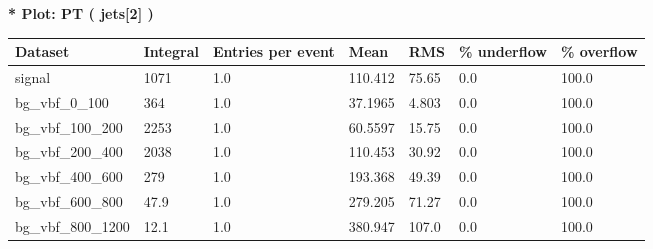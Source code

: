 \documentclass[a4paper, 10pt]{article}
\begin{document}
\textbf{* Plot: PT ( jets[2] ) }\\
   \begin{table}[H]
  \begin{center}
    \begin{tabular}{|m{23.0mm}|m{23.0mm}|m{18.0mm}|m{19.0mm}|m{19.0mm}|m{19.0mm}|m{19.0mm}|}
      \hline
      {\cellcolor{yellow}         Dataset}& {\cellcolor{yellow}         Integral}& {\cellcolor{yellow}         Entries per event}& {\cellcolor{yellow}         Mean}& {\cellcolor{yellow}         RMS}& {\cellcolor{yellow}         \% underflow}& {\cellcolor{yellow}         \% overflow}\\
      \hline
      {\cellcolor{white}         signal}& {\cellcolor{white}         1071}& {\cellcolor{white}         1.0}& {\cellcolor{white}         110.412}& {\cellcolor{white}         75.65}& {\cellcolor{red}         0.0}& {\cellcolor{red}         100.0}\\
      \hline
      {\cellcolor{white}         bg\_vbf\_0\_100}& {\cellcolor{white}         364}& {\cellcolor{white}         1.0}& {\cellcolor{white}         37.1965}& {\cellcolor{white}         4.803}& {\cellcolor{red}         0.0}& {\cellcolor{red}         100.0}\\
      \hline
      {\cellcolor{white}         bg\_vbf\_100\_200}& {\cellcolor{white}         2253}& {\cellcolor{white}         1.0}& {\cellcolor{white}         60.5597}& {\cellcolor{white}         15.75}& {\cellcolor{red}         0.0}& {\cellcolor{red}         100.0}\\
      \hline
      {\cellcolor{white}         bg\_vbf\_200\_400}& {\cellcolor{white}         2038}& {\cellcolor{white}         1.0}& {\cellcolor{white}         110.453}& {\cellcolor{white}         30.92}& {\cellcolor{red}         0.0}& {\cellcolor{red}         100.0}\\
      \hline
      {\cellcolor{white}         bg\_vbf\_400\_600}& {\cellcolor{white}         279}& {\cellcolor{white}         1.0}& {\cellcolor{white}         193.368}& {\cellcolor{white}         49.39}& {\cellcolor{red}         0.0}& {\cellcolor{red}         100.0}\\
      \hline
      {\cellcolor{white}         bg\_vbf\_600\_800}& {\cellcolor{white}         47.9}& {\cellcolor{white}         1.0}& {\cellcolor{white}         279.205}& {\cellcolor{white}         71.27}& {\cellcolor{red}         0.0}& {\cellcolor{red}         100.0}\\
      \hline
      {\cellcolor{white}         bg\_vbf\_800\_1200}& {\cellcolor{white}         12.1}& {\cellcolor{white}         1.0}& {\cellcolor{white}         380.947}& {\cellcolor{white}         107.0}& {\cellcolor{red}         0.0}& {\cellcolor{red}         100.0}\\

\end{tabular}
\end{center}
\end{table}
\end{document}
